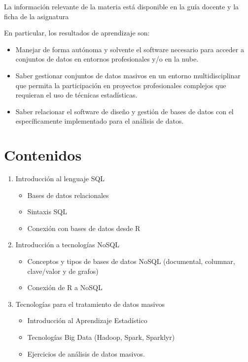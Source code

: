 \documentclass[
]{book}
\providecommand{\tightlist}{%
  \setlength{\itemsep}{0pt}\setlength{\parskip}{0pt}}
\theoremstyle{break}
\theoremstyle{nonumberplain}
\begin{document}
La información relevante de la materia está disponible en la guía docente y la ficha de la asignatura

En particular, los resultados de aprendizaje son:

\begin{itemize}
\item
  Manejar de forma autónoma y solvente el software necesario para acceder a conjuntos de datos en entornos profesionales y/o en la nube.
\item
  Saber gestionar conjuntos de datos masivos en un entorno multidisciplinar que permita la participación en proyectos profesionales complejos que requieran el uso de técnicas estadísticas.
\item
  Saber relacionar el software de diseño y gestión de bases de datos con el específicamente implementado para el análisis de datos.
\end{itemize}

\section{Contenidos}\label{contenidos}

\begin{enumerate}
\def\labelenumi{\arabic{enumi}.}
\tightlist
\item
  Introducción al lenguaje SQL

  \begin{itemize}
  \tightlist
  \item
    Bases de datos relacionales
  \item
    Sintaxis SQL
  \item
    Conexión con bases de datos desde R
  \end{itemize}
\item
  Introducción a tecnologías NoSQL

  \begin{itemize}
  \tightlist
  \item
    Conceptos y tipos de bases de datos NoSQL (documental, columnar, clave/valor y de grafos)
  \item
    Conexión de R a NoSQL
  \end{itemize}
\item
  Tecnologías para el tratamiento de datos masivos

  \begin{itemize}
  \tightlist
  \item
    Introducción al Aprendizaje Estadístico
  \item
    Tecnologías Big Data (Hadoop, Spark, Sparklyr)
  \item
    Ejercicios de análisis de datos masivos.
  \end{itemize}
\end{enumerate}
\end{document}
